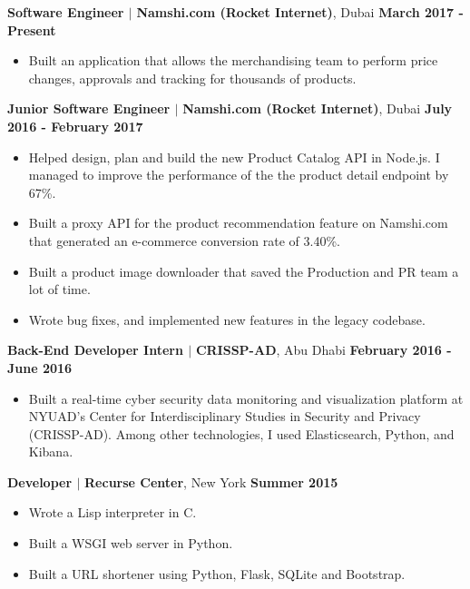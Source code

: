 \documentclass[11pt]{article} %
\begin{document}
\noindent \centerline {\large \textbf{Software Engineer \(\mid\)}\textbf { Namshi.com (Rocket Internet)}, Dubai \hfill \textbf{March 2017 - Present}}
\begin{itemize}\itemsep-0.1em
  \item Built an application that allows the merchandising team to perform price changes, approvals and tracking for thousands of products.
\end{itemize}  
\noindent \centerline {\large \textbf{Junior Software Engineer \(\mid\)}\textbf { Namshi.com (Rocket Internet)}, Dubai \hfill \textbf{July 2016 - February 2017}}
\begin{itemize}\itemsep-0.1em
  \item Helped design, plan and build the new Product Catalog API in Node.js. I managed to improve the performance of the the product detail endpoint by 67\%.
  \item Built a proxy API for the product recommendation feature on Namshi.com that generated an e-commerce conversion rate of 3.40\%.
  \item Built a product image downloader that saved the Production and PR team a lot of time. 
  \item Wrote bug fixes, and implemented new features in the legacy codebase.
  
\end{itemize}
\noindent \centerline {\large \textbf{Back-End Developer Intern \(\mid\)}\textbf { CRISSP-AD}, Abu Dhabi \hfill \textbf{February 2016 - June 2016}}
\begin{itemize}\itemsep-0.1em
  \item Built a real-time cyber security data monitoring and visualization platform at NYUAD's Center for Interdisciplinary Studies in Security and Privacy (CRISSP-AD). Among other technologies, I used Elasticsearch, Python, and Kibana. 
\end{itemize}
\noindent \centerline{\large \textbf{Developer \(\mid\)} \textbf {Recurse Center}, New York \hfill \textbf{Summer 2015}}
\begin{itemize}\itemsep-0.4em
  \item Wrote a Lisp interpreter in C. 
  \item Built a WSGI web server in Python.
  \item Built a URL shortener using Python, Flask, SQLite and Bootstrap.
\end{itemize}
\medskip

\vspace{0.05in}
\end{document}

